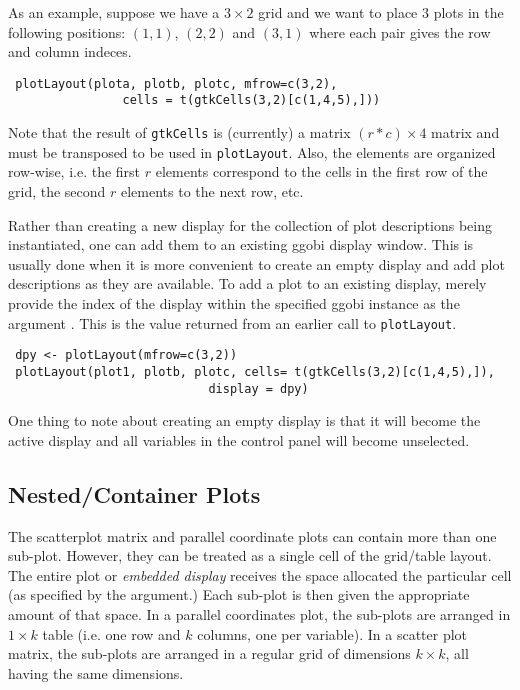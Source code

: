 \documentclass{article}
\def\SFunction#1{{\texttt{\red #1}}}
\begin{document}
As an example, suppose we have a $3 \times 2$ grid and we want to
place $3$ plots in the following positions: $(1,1)$, $(2,2)$ and
$(3,1)$ where each pair gives the row and column indeces.
\begin{verbatim}
 plotLayout(plota, plotb, plotc, mfrow=c(3,2),
                cells = t(gtkCells(3,2)[c(1,4,5),]))
\end{verbatim}
Note that the result of \SFunction{gtkCells} is (currently) a matrix
$(r \ast c) \times 4$ matrix and must be transposed to be used in
\SFunction{plotLayout}.  Also, the elements are organized row-wise,
i.e.  the first $r$ elements correspond to the cells in the first row
of the grid, the second $r$ elements to the next row, etc.



Rather than creating a new display for the collection of plot
descriptions being instantiated, one can add them to an existing ggobi
display window. This is usually done when it is more convenient to
create an empty display and add plot descriptions as they are
available. To add a plot to an existing display, merely provide the
index of the display within the specified ggobi instance as the
argument .  This is the value returned from an earlier
call to \SFunction{plotLayout}.
\begin{verbatim}
 dpy <- plotLayout(mfrow=c(3,2))
 plotLayout(plot1, plotb, plotc, cells= t(gtkCells(3,2)[c(1,4,5),]),
                            display = dpy)
\end{verbatim}
One thing to note about creating an empty display is that it
will become the active display and all variables in
the control panel will become unselected.



\subsection{Nested/Container Plots}
The scatterplot matrix and parallel coordinate plots can contain more
than one sub-plot.  However, they can be treated as a single cell of
the grid/table layout. The entire plot or \textit{embedded display}
receives the space allocated the particular cell (as specified by the
 argument.)  Each sub-plot is then given the appropriate
amount of that space.  In a parallel coordinates plot, the sub-plots
are arranged in $1 \times k$ table (i.e. one row and $k$ columns, one
per variable).  In a scatter plot matrix, the sub-plots are arranged
in a regular grid of dimensions $k \times k$, all having the same
dimensions.
\end{document}
